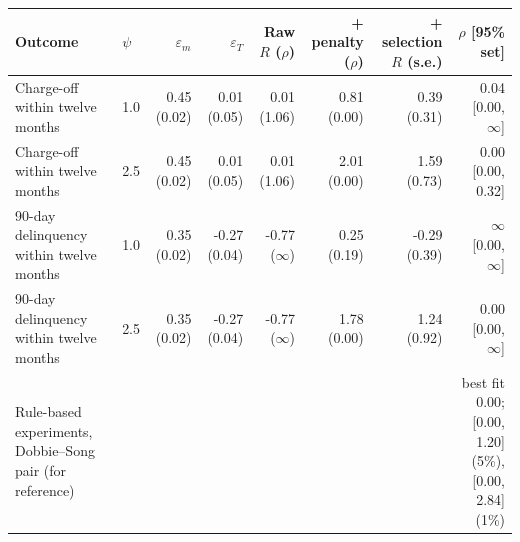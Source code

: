 \begin{tabular}{llrrrrrr}
\toprule
Outcome & $\psi$ & $\varepsilon_m$ & $\varepsilon_T$ & Raw $R$ ($\rho$) & + penalty ($\rho$) & + selection $R$ (s.e.) & $\rho$ [95\% set] \\
\midrule
Charge-off within twelve months & 1.0 & 0.45 (0.02) & 0.01 (0.05) & 0.01 (1.06) & 0.81 (0.00) & 0.39 (0.31) & 0.04 [0.00, $\infty$] \\
Charge-off within twelve months & 2.5 & 0.45 (0.02) & 0.01 (0.05) & 0.01 (1.06) & 2.01 (0.00) & 1.59 (0.73) & 0.00 [0.00, 0.32] \\
90-day delinquency within twelve months & 1.0 & 0.35 (0.02) & -0.27 (0.04) & -0.77 ($\infty$) & 0.25 (0.19) & -0.29 (0.39) & $\infty$ [0.00, $\infty$] \\
90-day delinquency within twelve months & 2.5 & 0.35 (0.02) & -0.27 (0.04) & -0.77 ($\infty$) & 1.78 (0.00) & 1.24 (0.92) & 0.00 [0.00, $\infty$] \\
\midrule
Rule-based experiments, Dobbie--Song pair (for reference) & & & & & & & best fit 0.00; [0.00, 1.20] (5\%), [0.00, 2.84] (1\%) \\
\bottomrule
\end{tabular}
